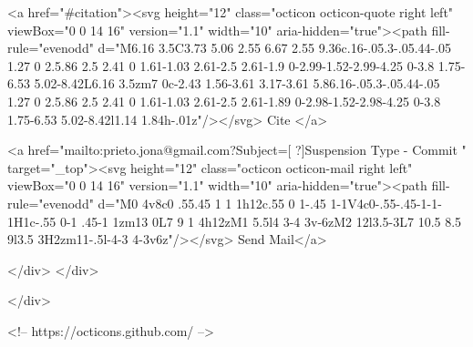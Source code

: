       <a  href="#citation"><svg height="12" class="octicon octicon-quote right left" viewBox="0 0 14 16" version="1.1" width="10" aria-hidden="true"><path fill-rule="evenodd" d="M6.16 3.5C3.73 5.06 2.55 6.67 2.55 9.36c.16-.05.3-.05.44-.05 1.27 0 2.5.86 2.5 2.41 0 1.61-1.03 2.61-2.5 2.61-1.9 0-2.99-1.52-2.99-4.25 0-3.8 1.75-6.53 5.02-8.42L6.16 3.5zm7 0c-2.43 1.56-3.61 3.17-3.61 5.86.16-.05.3-.05.44-.05 1.27 0 2.5.86 2.5 2.41 0 1.61-1.03 2.61-2.5 2.61-1.89 0-2.98-1.52-2.98-4.25 0-3.8 1.75-6.53 5.02-8.42l1.14 1.84h-.01z"/></svg> Cite
      </a>

      <a href="mailto:prieto.jona@gmail.com?Subject=[ ?]Suspension Type - Commit " target="_top"><svg height="12" class="octicon octicon-mail right left" viewBox="0 0 14 16" version="1.1" width="10" aria-hidden="true"><path fill-rule="evenodd" d="M0 4v8c0 .55.45 1 1 1h12c.55 0 1-.45 1-1V4c0-.55-.45-1-1-1H1c-.55 0-1 .45-1 1zm13 0L7 9 1 4h12zM1 5.5l4 3-4 3v-6zM2 12l3.5-3L7 10.5 8.5 9l3.5 3H2zm11-.5l-4-3 4-3v6z"/></svg> Send Mail</a>

    </div>
  </div>

</div>

<!-- https://octicons.github.com/ -->





